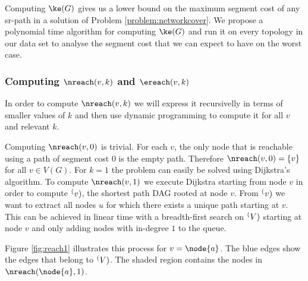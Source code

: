 Computing $\ke(G)$ gives us a lower bound on the maximum segment cost of any sr-path in a solution of Problem \ref{problem:networkcover}.
We propose a polynomial time algorithm for computing $\ke(G)$ and run it on every topology in our data set
to analyse the segment cost that we can expect to have on the worst case.

\subsubsection*{Computing $\nreach(v, k)$ and $\ereach(v, k)$}

In order to compute $\nreach(v, k)$ we will express it recursivelly in terms of smaller values of $k$ and then
use dynamic programming to compute it for all $v$ and relevant $k$.

Computing $\nreach(v, 0)$ is trivial. For each $v$, the only node that is reachable using a path of segment cost $0$ is the empty path.
Therefore $\nreach(v, 0) = \{ v \}$ for all $v \in V(G)$. For $k = 1$ the problem can easily be solved using Dijkstra's algorithm.
To compute $\nreach(v, 1)$ we execute Dijkstra starting from node $v$ in order to compute $\sp(v)$, the shortest path DAG rooted at node
$v$. From $\sp(v)$ we want to extract all nodes $u$ for which there exists a unique path starting at $v$. This can be achieved in linear time
with a breadth-first search on $\sp(V)$ starting at node $v$ and only adding nodes with in-degree $1$ to the queue.

Figure \ref{fig:reach1} illustrates this process for $v = \node{a}$. The blue edges show the edges that belong to $\sp(V)$. The shaded region 
contains the nodes in $\nreach(\node{a}, 1)$.


